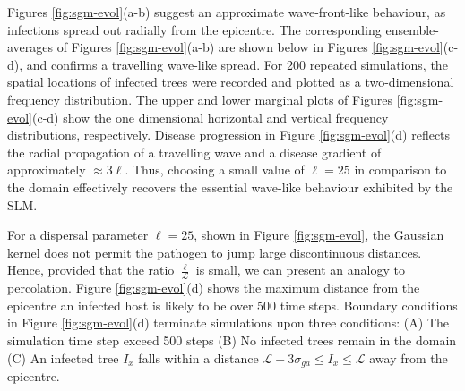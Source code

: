 Figures \ref{fig:sgm-evol}(a-b) suggest an approximate wave-front-like behaviour, as infections spread out radially from the epicentre.
The corresponding ensemble-averages of Figures \ref{fig:sgm-evol}(a-b) are shown below in Figures \ref{fig:sgm-evol}(c-d), and confirms a travelling wave-like spread.
For 200 repeated simulations, the spatial locations of infected trees were recorded and plotted as a two-dimensional frequency distribution.
The upper and lower marginal plots of Figures \ref{fig:sgm-evol}(c-d) show the one dimensional horizontal and vertical frequency distributions, respectively.
Disease progression in Figure \ref{fig:sgm-evol}(d) reflects the radial propagation of a travelling wave and a disease gradient of approximately $\approx 3\ell$.
Thus, choosing a small value of $\ell=25$ in comparison to the domain effectively recovers the essential wave-like behaviour exhibited by the SLM.

For a dispersal parameter $\ell=25$, shown in Figure \ref{fig:sgm-evol}, the Gaussian kernel does not permit the pathogen to jump large discontinuous distances.
Hence, provided that the ratio $\frac{\ell}{\mathcal{L}}$ is small, we can present an analogy to percolation.
Figure \ref{fig:sgm-evol}(d) shows the maximum distance from the epicentre an infected host is likely to be over 500 time steps.
Boundary conditions in Figure \ref{fig:sgm-evol}(d) terminate simulations upon three conditions: 
(A) The simulation time step exceed 500 steps 
(B) No infected trees remain in the domain 
(C) An infected tree $I_{x}$ falls within a distance $\mathcal{L} - 3\sigma_{ga} \leq I_{x} \leq \mathcal{L}$ away from the epicentre.
    
